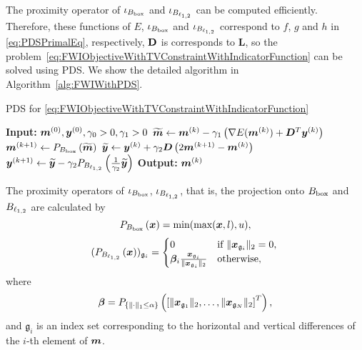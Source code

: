The proximity operator of $\iota_{B_{\mathrm{box}}}$ and $\iota_{B_{\ell_{1,2}}}$ can be computed efficiently.
Therefore, these functions of $E$, $\iota_{B_{\mathrm{box}}}$ and $\iota_{B_{\ell_{1,2}}}$ correspond to $f$, $g$ and $h$ in \eqref{eq:PDSPrimalEq}, respectively, $\mathbf{D}$ is corresponds to $\bm{L}$, so the problem~\eqref{eq:FWIObjectiveWithTVConstraintWithIndicatorFunction} can be solved using PDS.
We show the detailed algorithm in Algorithm~\ref{alg:FWIWithPDS}.
\begin{algorithm}[t]
    \caption{PDS for \eqref{eq:FWIObjectiveWithTVConstraintWithIndicatorFunction}}\label{alg:FWIWithPDS}
    \begin{algorithmic}[1]
        \Statex \textbf{Input:} $ \bm{m}^{(0)}, \bm{y}^{(0)}, \gamma_0 > 0, \gamma_1 > 0 $
            \State $\widetilde{\bm{m}} \leftarrow \bm{m}^{(k)} - \gamma_1 \left( \nabla E(\bm{m}^{(k)}) + \bm{D}^T \bm{y}^{(k)} \right) $
            \State $\bm{m}^{(k+1)}     \leftarrow P_{B_{\mathrm{box}}} \left( \widetilde{\bm{m}} \right) $
            \State $\widetilde{\bm{y}}     \leftarrow \bm{y}^{(k)} + \gamma_2 \bm{D} \left( 2\bm{m}^{(k+1)} - \bm{m}^{(k)} \right) $
            \State $\bm{y}^{(k+1)}         \leftarrow \widetilde{\bm{y}} - \gamma_2 P_{B_{\ell_{1,2}}}\left(\frac 1 {\gamma_2} {\widetilde{\bm y}}\right) $
        \EndWhile
        \Statex \textbf{Output:} $\bm{m}^{(k)}$
    \end{algorithmic}
\end{algorithm}


The proximity operators of $\iota_{B_{\mathrm{box}}}$, $\iota_{B_{\ell_{1,2}}}$, that is, the projection onto $B_{\mathrm{box}}$ and ${B_{\ell_{1,2}}}$ are calculated by
\begin{equation} \label{eq:ProximityOperatorForBoxConstraint} \projBoxSolution, \end{equation}
\begin{equation} \label{eq:ProximityOperatorForL12Ball} \projLOneTwoBallSolution \end{equation}
where
\begin{equation} \label{eq:ProximityOperatorForL12BallWhere} \projLOneTwoBallSolutionWhere, \end{equation}
and $\mathfrak{g}_i$ is an index set corresponding to the horizontal and vertical differences of the $i$-th element of $\bm{m}$.

